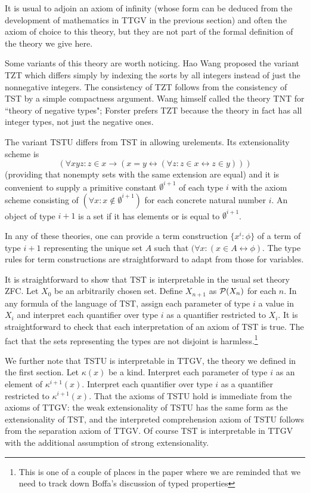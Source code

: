 \documentclass[12pt]{article}
\begin{document}
It is usual to adjoin an axiom of infinity (whose form can be deduced from the development of mathematics in TTGV in the previous section) and often the axiom of choice to this theory, but they are not part of the formal definition of the theory we give here.

Some variants of this theory are worth noticing.  Hao Wang proposed the variant TZT which differs simply by indexing the sorts by all integers instead of just the nonnegative integers.  The consistency of TZT follows from the consistency of TST by a simple compactness argument.  Wang himself called the theory TNT for ``theory of negative types";  Forster prefers TZT because the theory in fact has all integer types, not just the negative ones.

The variant TSTU differs from TST in allowing urelements.  Its extensionality scheme is $$(\forall xyz:z\in x \rightarrow(x=y \leftrightarrow (\forall z:z\in x \leftrightarrow z \in y)))$$ (providing that nonempty sets with the same extension are equal) and it is convenient to supply a primitive constant $\emptyset^{i+1}$ of each type $i$ with the axiom scheme consisting of $(\forall x:x \not\in \emptyset^{i+1})$ for each concrete natural number $i$.  An object of type $i+1$ is a set if it has elements or is equal to $\emptyset^{i+1}$.

In any of these theories, one can provide a term construction $\{x^i:\phi\}$ of a term of type $i+1$ representing the unique set $A$ such that $(\forall x:(x \in A \leftrightarrow \phi)$.  The type rules for term constructions are straightforward to adapt from those for variables.

It is straightforward to show that TST is interpretable in the usual set theory ZFC.  Let $X_0$ be an arbitrarily chosen set. Define $X_{n+1}$ as ${\cal P}(X_n)$ for each $n$.  In any formula of the language of TST, assign each parameter
of type $i$ a value in $X_i$ and interpret each quantifier over type $i$ as a quantifier restricted to $X_i$.  It is straightforward to check that each interpretation of an axiom of TST is true.   The fact that the sets representing the types are not disjoint is harmless.\footnote{This is one of a couple of places in the paper where we are reminded that we need to track down Boffa's discussion of typed properties}

We further note that TSTU is interpretable in TTGV, the theory we defined in the first section.  Let $\kappa(x)$ be a kind.  Interpret each parameter of type $i$ as an element of $\kappa^{i+1}(x)$.  Interpret each quantifier over type $i$ as a quantifier restricted to $\kappa^{i+1}(x)$.  That the axioms of TSTU hold is immediate from the axioms of TTGV:  the weak extensionality of TSTU has the same form as the extensionality of TST, and the interpreted comprehension axiom of TSTU follows from
the separation axiom of TTGV.  Of course TST is interpretable in TTGV with the additional assumption of strong extensionality.
\end{document}
